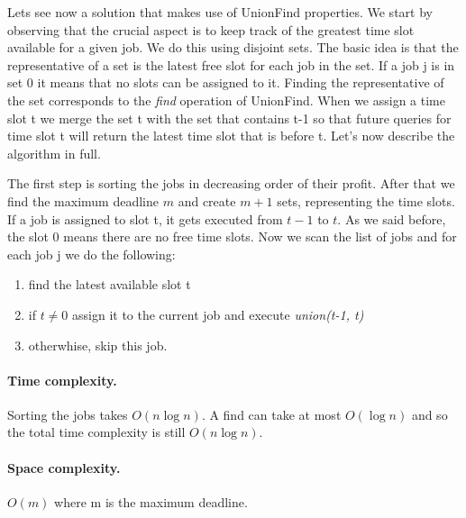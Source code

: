 \documentclass{article}
\begin{document}
\medskip

Lets see now a solution that makes use of UnionFind properties. We start by observing that the crucial aspect
is to keep track of the greatest time slot available for a given job. We do this using disjoint sets. The basic idea is that the representative of a set
is the latest free slot for each job in the set. If a job j is in set 0 it means that no slots can be assigned to it. Finding the representative
of the set corresponds to the \emph{find} operation of UnionFind. When we assign a time slot t
we merge the set t with the set that contains t-1 so that future queries for time slot t will return the latest time slot that is before t. Let's now describe the algorithm in full.

\medskip

The first step is sorting the jobs in decreasing order of their profit. After that we find the maximum deadline $m$ and create $m+1$ sets, representing the time slots.
If a job is assigned to slot t, it gets executed from $t-1$ to $t$. As we said before, the slot 0 means there are no free time slots. Now we scan the list  of jobs and for each job j
we do the following:\begin{enumerate}
    \item find the latest available slot t
    \item if $t \neq 0$ assign it to the current job and
    execute \emph{union(t-1, t)}
    \item otherwhise, skip this job.
\end{enumerate}

\paragraph{Time complexity.} Sorting the jobs takes $O(n \log n)$.
A find can take at most $O(\log n)$ and so the total time complexity is still $O(n\log n)$.
\paragraph{Space complexity.} $O(m)$ where m is the maximum deadline.



\end{document}
